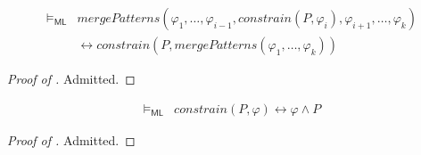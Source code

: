 \documentclass{article}
\newcommand{\ML}{\mathsf{ML}}
\begin{document}
\begin{lemma}\label{lem:constrainMergeComm}
    \begin{align*}
        \vDash_\ML & \mathit{mergePatterns}(\varphi_1, \ldots, \varphi_{i-1}, \mathit{constrain}(P, \varphi_i), \varphi_{i+1}, \ldots, \varphi_k) \\
        & \leftrightarrow \mathit{constrain}(P, \mathit{mergePatterns(\varphi_1, \ldots, \varphi_k)})
    \end{align*}
\end{lemma}
\begin{proof}[Proof of ]
Admitted.
\end{proof}

\begin{lemma}\label{lem:constrainAsConjunction}
    \begin{align*}
        \vDash_{\ML} & \mathit{constrain}(P, \varphi) \leftrightarrow \varphi \land P
    \end{align*}
\end{lemma}
\begin{proof}[Proof of ]
Admitted.
\end{proof}
\end{document}
